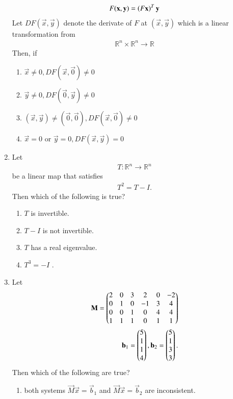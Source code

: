 \begin{enumerate}[label=\thesection.\arabic*.,ref=\thesection.\theenumi]
\begin{align}
F(\mathbf{x},\mathbf{y}) = \left(F\mathbf{x}\right)^T\mathbf{y}
\end{align}
Let $DF(\vec{x},\vec{y}) $ denote the derivate of $F$ at $(\vec{x},\vec{y}) $ which is 
a linear transformation from 
\begin{align}
\mathbb{R}^n \times \mathbb{R}^n \to \mathbb{R}
\end{align}
%
Then, if 
\begin{enumerate}
\item $\vec{x} \ne 0, DF(\vec{x},\vec{0}) \ne 0$ 
\item $\vec{y} \ne 0, DF(\vec{0},\vec{y}) \ne 0$ 
\item $(\vec{x},\vec{y}) \ne (\vec{0},\vec{0}), DF(\vec{x},\vec{0}) \ne 0$ 
\item $\vec{x} = 0$ or  $\vec{y} = 0, DF(\vec{x},\vec{y}) = 0$ 
\end{enumerate}  
%
\item Let
\begin{align}
T: \mathbb{R}^n \to \mathbb{R}^n
\end{align}
%
be a linear map that satisfies 
\begin{align}
T^2 = T-I.
\end{align}
Then which of the following is true?
\begin{enumerate}
\item $T$ is invertible. 
\item $T-I$ is not invertible. 
\item $T$ has a real eigenvalue. 
\item $T^3 = -I$ . 
\end{enumerate}
%
\solution

\item Let
\begin{align}
\mathbf{M} = 
\begin{pmatrix}
2 & 0 & 3 & 2 & 0 & -2
\\
0 & 1 & 0 & -1 & 3 & 4
\\
0 & 0 & 1 & 0 & 4 & 4
\\
1 & 1 & 1 & 0 & 1 & 1
\end{pmatrix}
\\
\mathbf{b}_1 = \begin{pmatrix}5 \\ 1 \\ 1 \\ 4\end{pmatrix},
\mathbf{b}_2 = \begin{pmatrix}5 \\ 1 \\ 3 \\ 3\end{pmatrix}.
\end{align}  
Then which of the following are true?
\begin{enumerate}
\item both systems $\vec{M}\vec{x} = \vec{b}_1$ and $\vec{M}\vec{x} = \vec{b}_2$ are inconsistent.

\end{enumerate}
\end{enumerate}
